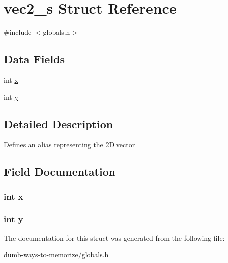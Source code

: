 \hypertarget{structvec2__s}{}\section{vec2\+\_\+s Struct Reference}
\label{structvec2__s}


{\ttfamily \#include $<$globals.\+h$>$}

\subsection*{Data Fields}
\begin{DoxyCompactItemize}
\item 
int \hyperlink{structvec2__s_a6150e0515f7202e2fb518f7206ed97dc}{x}
\item 
int \hyperlink{structvec2__s_a0a2f84ed7838f07779ae24c5a9086d33}{y}
\end{DoxyCompactItemize}


\subsection{Detailed Description}
Defines an alias representing the 2D vector 

\subsection{Field Documentation}
\subsubsection[{\texorpdfstring{x}{x}}]{\setlength{\rightskip}{0pt plus 5cm}int x}\hypertarget{structvec2__s_a6150e0515f7202e2fb518f7206ed97dc}{}\label{structvec2__s_a6150e0515f7202e2fb518f7206ed97dc}
\subsubsection[{\texorpdfstring{y}{y}}]{\setlength{\rightskip}{0pt plus 5cm}int y}\hypertarget{structvec2__s_a0a2f84ed7838f07779ae24c5a9086d33}{}\label{structvec2__s_a0a2f84ed7838f07779ae24c5a9086d33}


The documentation for this struct was generated from the following file\+:\begin{DoxyCompactItemize}
\item 
dumb-\/ways-\/to-\/memorize/\hyperlink{globals_8h}{globals.\+h}\end{DoxyCompactItemize}
